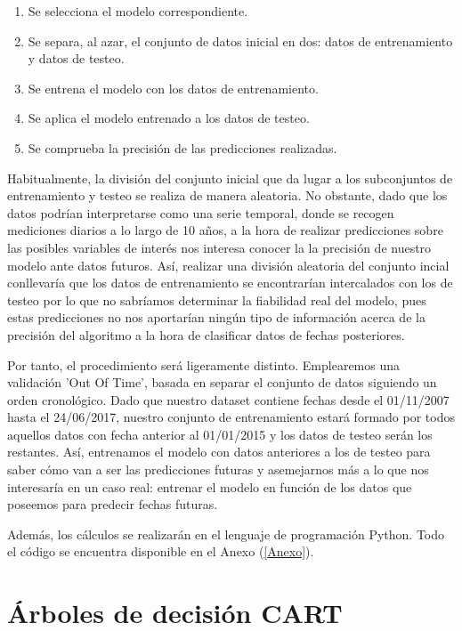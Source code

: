 \documentclass[12pt,twoside]{article}
\begin{document}
\begin{enumerate}
\item Se selecciona el modelo correspondiente.
\item Se separa, al azar, el conjunto de datos inicial en dos: datos de entrenamiento y datos de testeo.
\item Se entrena el modelo con los datos de entrenamiento.
\item Se aplica el modelo entrenado a los datos de testeo.
\item Se comprueba la precisión de las predicciones realizadas.
\end{enumerate}

Habitualmente, la división del conjunto inicial que da lugar a los subconjuntos de entrenamiento y testeo se realiza de manera aleatoria. No obstante, dado que los datos podrían interpretarse como una serie temporal, donde se recogen mediciones diarios a lo largo de 10 años, a la hora de realizar predicciones sobre las posibles variables de interés nos interesa conocer la la precisión de nuestro modelo ante datos futuros.  Así, realizar una división aleatoria del conjunto incial conllevaría que los datos de entrenamiento se encontrarían intercalados con los de testeo por lo que no sabríamos determinar la fiabilidad real del modelo, pues estas predicciones no nos aportarían ningún tipo de información acerca de la precisión del algoritmo a la hora de clasificar datos de fechas posteriores.

Por tanto, el procedimiento será ligeramente distinto. Emplearemos una validación 'Out Of Time', basada en separar el conjunto de datos siguiendo un orden cronológico. Dado que nuestro dataset contiene fechas desde el 01/11/2007 hasta el 24/06/2017, nuestro conjunto de entrenamiento estará formado por todos aquellos datos con fecha anterior al 01/01/2015 y los datos de testeo serán los restantes. Así, entrenamos el modelo con datos anteriores a los de testeo para saber cómo van a ser las predicciones futuras y asemejarnos más a lo que nos interesaría en un caso real: entrenar el modelo en función de los datos que poseemos para predecir fechas futuras.

Además, los cálculos se realizarán en el lenguaje de programación Python. Todo el código se encuentra disponible en el Anexo (\ref{Anexo}).



\newpage



\section{Árboles de decisión CART}
\end{document}
